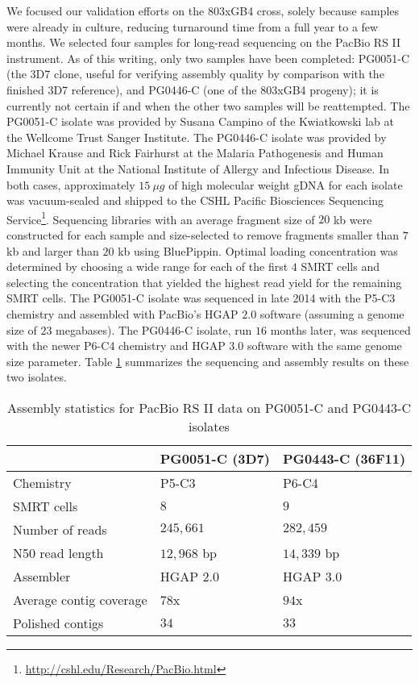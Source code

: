 We focused our validation efforts on the 803xGB4 cross, solely because samples were already in culture, reducing turnaround time from a full year to a few months.  We selected four samples for long-read sequencing on the PacBio RS II instrument.  As of this writing, only two samples have been completed: PG0051-C (the 3D7 clone, useful for verifying assembly quality by comparison with the finished 3D7 reference), and PG0446-C (one of the 803xGB4 progeny); it is currently not certain if and when the other two samples will be reattempted.  The PG0051-C isolate was provided by Susana Campino of the Kwiatkowski lab at the Wellcome Trust Sanger Institute.  The PG0446-C isolate was provided by Michael Krause and Rick Fairhurst at the Malaria Pathogenesis and Human Immunity Unit at the National Institute of Allergy and Infectious Disease.  In both cases, approximately $15~{\mu}g$ of high molecular weight gDNA for each isolate was vacuum-sealed and shipped to the CSHL Pacific Biosciences Sequencing Service\footnote{\url{http://cshl.edu/Research/PacBio.html}}.  Sequencing libraries with an average fragment size of $20$ kb were constructed for each sample and size-selected to remove fragments smaller than $7$ kb and larger than $20$ kb using BluePippin.  Optimal loading concentration was determined by choosing a wide range for each of the first $4$ SMRT cells and selecting the concentration that yielded the highest read yield for the remaining SMRT cells.  The PG0051-C isolate was sequenced in late 2014 with the P5-C3 chemistry and assembled with PacBio's HGAP $2.0$ software (assuming a genome size of $23$ megabases).  The PG0446-C isolate, run $16$ months later, was sequenced with the newer P6-C4 chemistry and HGAP $3.0$ software with the same genome size parameter.  Table \ref{tbl:asmstatspacbio} summarizes the sequencing and assembly results on these two isolates.

\begin{table}[]
\centering
\caption{Assembly statistics for PacBio RS II data on PG0051-C and PG0443-C isolates}
\label{tbl:asmstatspacbio}
\begin{tabular}{@{}lll@{}}
\toprule
                        & PG0051-C (3D7)   & PG0443-C (36F11)   \\ \midrule
Chemistry               & P5-C3            & P6-C4              \\
SMRT cells              & $8$              & $9$                \\
Number of reads         & $245,661$        & $282,459$          \\
N50 read length         & $12,968$ bp      & $14,339$ bp        \\
Assembler               & HGAP $2.0$       & HGAP $3.0$         \\
Average contig coverage & $78$x            & $94$x              \\
Polished contigs        & $34$             & $33$               \\ \bottomrule
\end{tabular}
\end{table}

